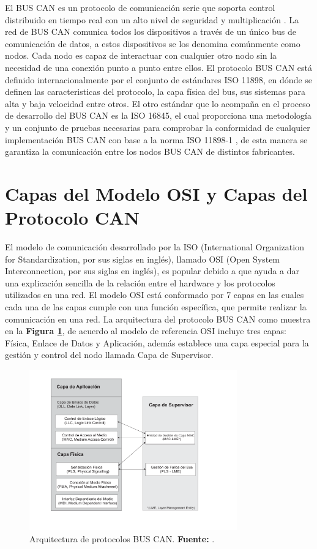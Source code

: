 El BUS CAN es un protocolo de comunicación serie que soporta control distribuido en tiempo real con un alto nivel de seguridad y multiplicación  \cite{PSMR}. La red de BUS CAN comunica todos los dispositivos a través de un único bus de comunicación de datos, a estos dispositivos se los denomina comúnmente como nodos. Cada nodo es capaz de interactuar con cualquier otro nodo sin la necesidad de una conexión punto a punto entre ellos.
El protocolo BUS CAN está definido internacionalmente por el conjunto de estándares ISO 11898, en dónde se definen las caracteristicas del protocolo, la capa física del bus, sus sistemas para alta y baja velocidad entre otros. El otro estándar que lo acompaña en el proceso de desarrollo del BUS CAN es la ISO 16845, el cual proporciona una  metodología y un conjunto de pruebas necesarias para comprobar la conformidad de cualquier implementación BUS CAN con base a la norma ISO 11898-1 \cite{ISO}, de esta manera se garantiza la comunicación entre los nodos BUS CAN de distintos fabricantes.

\section {Capas del Modelo OSI y Capas del Protocolo CAN}
El modelo de comunicación desarrollado por la ISO (International Organization for Standardization, por sus siglas en inglés), llamado OSI (Open System Interconnection, por sus siglas en inglés), es popular debido a que ayuda a dar una explicación  sencilla de la relación entre el hardware  y los protocolos utilizados en una red. El modelo OSI está conformado por 7 capas en las cuales cada una de las capas cumple con una función específica, que permite realizar la comunicación en una red.
La arquitectura del protocolo BUS CAN como muestra en la \textbf{Figura \ref{ABC}}, de acuerdo al modelo de referencia OSI incluye tres capas: Física, Enlace de Datos y Aplicación, además establece una capa especial para la gestión y control del nodo llamada Capa de Supervisor. 


\begin{figure}[H]
	\centering
		\includegraphics[width=0.8\textwidth]{./Cap2imagen/protocolocan.pdf}
	\caption[Arquitectura de protocolos BUS CAN.]{Arquitectura de protocolos BUS CAN.\textbf{ Fuente:} \cite{DSEEPC}.}
	\label{ABC} %
\end{figure}

